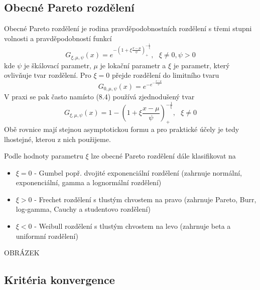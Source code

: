 \subsection{Obecné Pareto rozdělení}

Obecné Pareto rozdělení je rodina pravděpodobnostních rozdělení s třemi stupni volnosti a pravděpodobností funkcí
\begin{equation}
G_{\xi, \mu, \psi}(x) = e^{-\left(1 + \xi \frac{x - \mu}{\psi}\right)_{+}^{-\frac{1}{\xi}}}, ~~~ \xi \ne 0, \psi > 0
\end{equation}
kde $\psi$ je škálovací parametr, $\mu$ je lokační parametr a $\xi$ je parametr, který ovlivňuje tvar rozdělení. Pro $\xi = 0$ přejde rozdělení do limitního tvaru
\begin{equation}
G_{0, \mu, \psi}(x) = e^{-e^{-\frac{x - \mu}{\psi}}}
\end{equation}
V praxi se pak často namísto (8.4) používá zjednodušený tvar
\begin{equation}
G_{\xi, \mu, \psi}(x) = 1 - \left(1 + \xi \frac{x - \mu}{\psi}\right)_{+}^{-\frac{1}{\xi}}, ~~~ \xi \ne 0
\end{equation}
Obě rovnice mají stejnou asymptotickou formu a pro praktické účely je tedy lhostejné, kterou z nich použijeme.

Podle hodnoty parametru $\xi$ lze obecné Pareto rozdělení dále klasifikovat na
\begin{itemize}
\item $\xi = 0$ - Gumbel popř. dvojité exponenciální rozdělení (zahrnuje normální, exponenciální, gamma a lognormální rozdělení)
\item $\xi > 0$ - Frechet rozdělení s tlustým chvostem na pravo (zahrnuje Pareto, Burr, log-gamma, Cauchy a studentovo rozdělení)
\item $\xi < 0$ - Weibull rozdělení s tlustým chvostem na levo (zahrnuje beta a uniformní rozdělení)
\end{itemize}

OBRÁZEK

\subsection{Kritéria konvergence}

